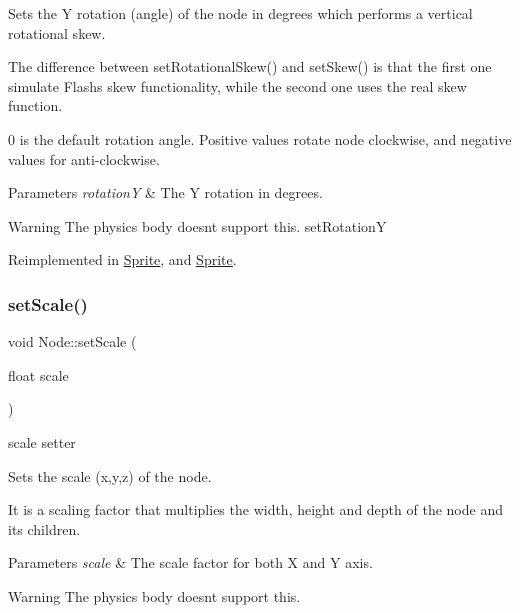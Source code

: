 Sets the Y rotation (angle) of the node in degrees which performs a vertical rotational skew.

The difference between {\ttfamily set\+Rotational\+Skew()} and {\ttfamily set\+Skew()} is that the first one simulate Flash\textquotesingle{}s skew functionality, while the second one uses the real skew function.

0 is the default rotation angle. Positive values rotate node clockwise, and negative values for anti-\/clockwise.


\begin{DoxyParams}{Parameters}
{\em rotationY} & The Y rotation in degrees.\\
\hline
\end{DoxyParams}
\begin{DoxyWarning}{Warning}
The physics body doesn\textquotesingle{}t support this.  set\+RotationY 
\end{DoxyWarning}


Reimplemented in \hyperlink{classSprite_a5f3af508d1f9e146ac93c0eaad44dfb1}{Sprite}, and \hyperlink{classSprite_a7ed528b143e0a099f143bc1dbb39cdb1}{Sprite}.

\mbox{\label{classNode_acf0955a52f51a9d6c8b0c9267b1e8668}} 
\subsubsection{\texorpdfstring{set\+Scale()}{setScale()}\hspace{0.1cm}{\footnotesize\ttfamily [1/4]}}
{\footnotesize\ttfamily void Node\+::set\+Scale (\begin{DoxyParamCaption}\item[{float}]{scale }\end{DoxyParamCaption})\hspace{0.3cm}{\ttfamily [virtual]}}



scale setter 

Sets the scale (x,y,z) of the node.

It is a scaling factor that multiplies the width, height and depth of the node and its children.


\begin{DoxyParams}{Parameters}
{\em scale} & The scale factor for both X and Y axis.\\
\hline
\end{DoxyParams}
\begin{DoxyWarning}{Warning}
The physics body doesn\textquotesingle{}t support this. 
\end{DoxyWarning}


